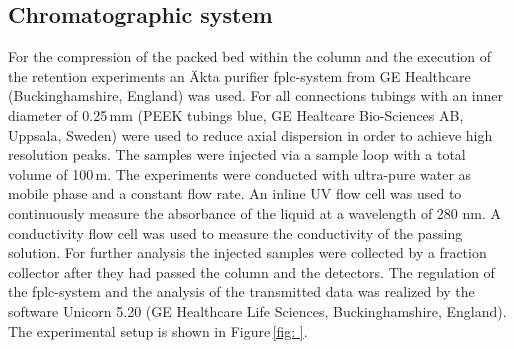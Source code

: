 % 
% 
%         


\subsection{Chromatographic system}
\label{subsec:chrom_sys}
For the compression of the packed bed within the column and the execution of the retention experiments an Äkta purifier \gls{fplc}-system from GE Healthcare (Buckinghamshire, England) was used. For all connections tubings with an inner diameter of 0.25\,mm (PEEK tubings blue, GE Healtcare Bio-Sciences AB, Uppsala, Sweden) were used to reduce axial dispersion in order to achieve high resolution peaks. The samples were injected via a sample loop with a total volume of 100\,\textmu m. The experiments were conducted with ultra-pure water as mobile phase and a constant flow rate. An inline UV flow cell was used to continuously measure the absorbance of the liquid at a wavelength of 280 nm. A conductivity flow cell was used to measure the conductivity of the passing solution. For further analysis the injected samples were collected by a fraction collector after they had passed the column and the detectors. The regulation of the \gls{fplc}-system and the analysis of the transmitted data was realized by the software Unicorn 5.20 (GE Healthcare Life Sciences, Buckinghamshire, England). The experimental setup is shown in Figure\,\ref{fig:  }.

